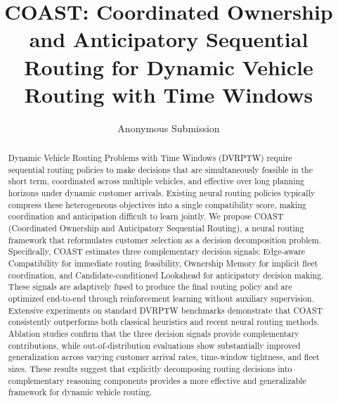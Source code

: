 \documentclass[letterpaper]{article}
\begin{document}
\title{COAST: Coordinated Ownership and Anticipatory Sequential Routing for Dynamic Vehicle Routing with Time Windows}
\author{Anonymous Submission}
\affiliations{}

	
\maketitle

\begin{abstract}
Dynamic Vehicle Routing Problems with Time Windows (DVRPTW) require sequential routing policies to make decisions that are simultaneously feasible in the short term, coordinated across multiple vehicles, and effective over long planning horizons under dynamic customer arrivals. Existing neural routing policies typically compress these heterogeneous objectives into a single compatibility score, making coordination and anticipation difficult to learn jointly. We propose COAST (Coordinated Ownership and Anticipatory Sequential Routing), a neural routing framework that reformulates customer selection as a decision decomposition problem. Specifically, COAST estimates three complementary decision signals: Edge-aware Compatibility for immediate routing feasibility, Ownership Memory for implicit fleet coordination, and Candidate-conditioned Lookahead for anticipatory decision making. These signals are adaptively fused to produce the final routing policy and are optimized end-to-end through reinforcement learning without auxiliary supervision. Extensive experiments on standard DVRPTW benchmarks demonstrate that COAST consistently outperforms both classical heuristics and recent neural routing methods. Ablation studies confirm that the three decision signals provide complementary contributions, while out-of-distribution evaluations show substantially improved generalization across varying customer arrival rates, time-window tightness, and fleet sizes. These results suggest that explicitly decomposing routing decisions into complementary reasoning components provides a more effective and generalizable framework for dynamic vehicle routing.

\end{abstract}
\end{document}
